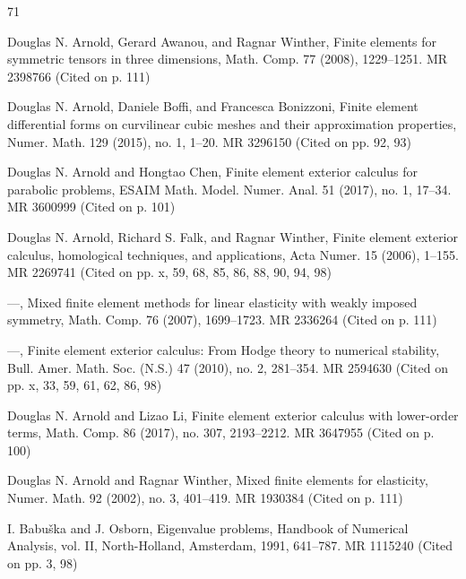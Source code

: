 \begin{MBSourceBibliography}{71}
\item\label{bib:source-8}Douglas N. Arnold, Gerard Awanou, and Ragnar Winther, Finite elements for symmetric tensors in three dimensions, Math. Comp. 77 (2008), 1229–1251. MR 2398766 (Cited on p. 111)

\item\label{bib:source-9}Douglas N. Arnold, Daniele Boffi, and Francesca Bonizzoni, Finite element differential forms on curvilinear cubic meshes and their approximation properties, Numer. Math. 129 (2015), no. 1, 1–20. MR 3296150 (Cited on pp. 92, 93)

\item\label{bib:source-10}Douglas N. Arnold and Hongtao Chen, \newline Finite element exterior calculus for parabolic problems, ESAIM Math. Model. Numer. Anal. 51 (2017), no. 1, 17–34. MR 3600999 (Cited on p. 101)

\item\label{bib:source-11}Douglas N. Arnold, Richard S. Falk, and Ragnar Winther, Finite element exterior calculus, homological techniques, and applications, Acta Numer. 15 (2006), 1–155. MR 2269741 (Cited on pp. x, 59, 68, 85, 86, 88, 90, 94, 98)

\item\label{bib:source-12}—, Mixed finite element methods for linear elasticity with weakly imposed symmetry, Math. Comp. 76 (2007), 1699–1723. MR 2336264 (Cited on p. 111)

\item\label{bib:source-13}—, Finite element exterior calculus: From Hodge theory to numerical stability, Bull. Amer. Math. Soc. (N.S.) 47 (2010), no. 2, 281–354. MR 2594630 (Cited on pp. x, 33, 59, 61, 62, 86, 98)

\item\label{bib:source-14}Douglas N. Arnold and Lizao Li, Finite element exterior calculus with lower-order terms, Math. Comp. 86 (2017), no. 307, 2193–2212. MR 3647955 (Cited on p. 100)

\item\label{bib:source-15}Douglas N. Arnold and Ragnar Winther, Mixed finite elements for elasticity, Numer. Math. 92 (2002), no. 3, 401–419. MR 1930384 (Cited on p. 111)

\item\label{bib:source-16}I. Babuška and J. Osborn, Eigenvalue problems, Handbook of Numerical Analysis, vol. II, North-Holland, Amsterdam, 1991, 641–787. MR 1115240 (Cited on pp. 3, 98)


\end{MBSourceBibliography}
